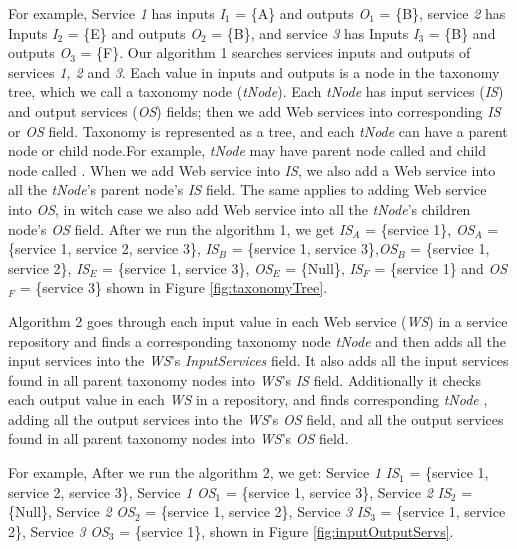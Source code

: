 For example, Service \emph{1} has inputs \emph{I}$_1$ = \Big\{A\Big\} and outputs \emph{O}$_1$ = \Big\{B\Big\}, service \emph{2} has Inputs \emph{I}$_2$ = \Big\{E\Big\}  and outputs \emph{O}$_2$ = \Big\{B\Big\}, and service \emph{3} has Inputs \emph{I}$_3$ = \Big\{B\Big\}  and outputs \emph{O}$_3$ = \Big\{F\Big\}. Our algorithm 1 searches services inputs and outputs of services \emph{1, 2} and \emph{3}. Each value in inputs and outputs is a node in the taxonomy tree, which we call a taxonomy node (\emph{tNode}). Each \emph{tNode} has input services (\emph{IS}) and output services (\emph{OS}) fields; then we add Web services into corresponding \emph{IS} or \emph{OS} field. Taxonomy is represented as a tree, and each \emph{tNode} can have a parent node or child node.For example,  \emph{tNode} may have parent node called  and child node called . When we add Web service into \emph{IS}, we also add a Web service into all the \emph{tNode}'s parent node's \emph{IS} field. The same applies to adding Web service into \emph{OS}, in witch case we also add Web service into all the \emph{tNode}'s children node's \emph{OS} field. After we run the algorithm 1, we get \emph{IS}$_A$ = \Big\{service 1\Big\}, \emph{OS}$_A$ = \Big\{service 1, service 2, service 3\Big\}, \emph{IS}$_B$ = \Big\{service 1, service 3\Big\},\emph{OS}$_B$ = \Big\{service 1, service 2\Big\}, \emph{IS}$_E$ = \Big\{service 1, service 3\Big\}, \emph{OS}$_E$ = \Big\{Null\Big\}, \emph{IS}$_F$ = \Big\{service 1\Big\} and \emph{OS}$_F$ = \Big\{service 3\Big\} shown in Figure \ref{fig:taxonomyTree}. \par

Algorithm 2 goes through each input value in each Web service (\emph{WS}) in a service repository and finds a corresponding taxonomy node \emph{tNode} and then adds all the input services into the \emph{WS}'s \emph{InputServices} field. It also adds all the input services found in all parent taxonomy nodes into \emph{WS}'s \emph{IS} field. Additionally it checks each output value in each \emph{WS} in a repository, and finds corresponding \emph{tNode} , adding all the output services into the \emph{WS}'s \emph{OS} field, and all the output services found in all parent taxonomy nodes into \emph{WS}'s \emph{OS} field.

For example,  After we run the algorithm 2, we get: 
Service \emph{1} \emph{IS}$_1$ = \Big\{service 1, service 2, service 3\Big\},
Service \emph{1} \emph{OS}$_1$ = \Big\{service 1, service 3\Big\},
Service \emph{2} \emph{IS}$_2$ = \Big\{Null\Big\},
Service \emph{2} \emph{OS}$_2$ = \Big\{service 1, service 2\Big\},
Service \emph{3} \emph{IS}$_3$ = \Big\{service 1, service 2\Big\},
Service \emph{3} \emph{OS}$_3$ = \Big\{service 1\Big\}, shown in Figure \ref{fig:inputOutputServs}.\par


